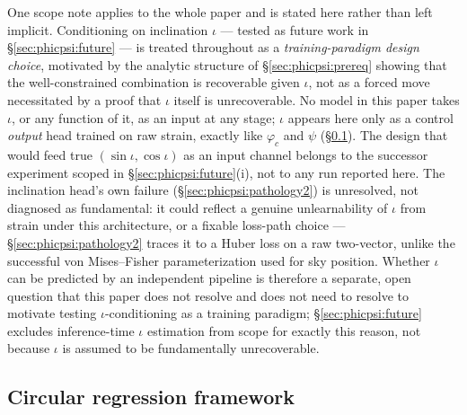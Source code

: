 One scope note applies to the whole paper and is stated here rather than left implicit.
Conditioning on inclination $\iota$ --- tested as future work in \S\ref{sec:phicpsi:future} --- is treated throughout as a \emph{training-paradigm design choice}, motivated by the analytic structure of \S\ref{sec:phicpsi:prereq} showing that the well-constrained combination is recoverable given $\iota$, not as a forced move necessitated by a proof that $\iota$ itself is unrecoverable.
No model in this paper takes $\iota$, or any function of it, as an input at any stage; $\iota$ appears here only as a control \emph{output} head trained on raw strain, exactly like $\varphi_c$ and $\psi$ (\S\ref{sec:phicpsi:circular}).
The design that would feed true $(\sin\iota, \cos\iota)$ as an input channel belongs to the successor experiment scoped in \S\ref{sec:phicpsi:future}(i), not to any run reported here.
The inclination head's own failure (\S\ref{sec:phicpsi:pathology2}) is unresolved, not diagnosed as fundamental: it could reflect a genuine unlearnability of $\iota$ from strain under this architecture, or a fixable loss-path choice --- \S\ref{sec:phicpsi:pathology2} traces it to a Huber loss on a raw two-vector, unlike the successful von Mises--Fisher parameterization used for sky position.
Whether $\iota$ can be predicted by an independent pipeline is therefore a separate, open question that this paper does not resolve and does not need to resolve to motivate testing $\iota$-conditioning as a training paradigm; \S\ref{sec:phicpsi:future} excludes inference-time $\iota$ estimation from scope for exactly this reason, not because $\iota$ is assumed to be fundamentally unrecoverable.

\subsection{Circular regression framework}
\label{sec:phicpsi:circular}

